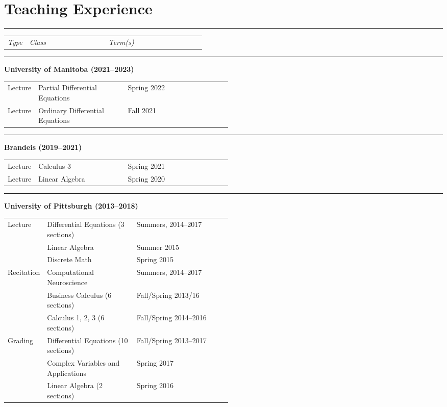 \documentclass[a4paper,11pt]{article}
\begin{document}
\newpage

\section{Teaching Experience}

\noindent\rule{15cm}{0.4pt}

\begin{tabular}{p{0.11\linewidth}p{0.4\linewidth}p{.3\linewidth}}
	\textit{Type} & \textit{Class} & \textit{Term(s)}
\end{tabular}

\noindent\rule{15cm}{0.4pt}

\textbf{University of Manitoba (2021--2023)}

\begin{tabular}{p{0.11\linewidth}p{0.4\linewidth}p{.3\linewidth}}
	{Lecture} & Partial Differential Equations & Spring 2022\\
    {Lecture} & Ordinary Differential Equations & Fall 2021
\end{tabular}


\noindent\rule{15cm}{0.4pt}

\textbf{Brandeis (2019--2021)}

\begin{tabular}{p{0.11\linewidth}p{0.4\linewidth}p{.3\linewidth}}
    {Lecture} & Calculus 3 & Spring 2021\\
    {Lecture} & Linear Algebra & Spring 2020
\end{tabular}

\noindent\rule{15cm}{0.4pt}

\textbf{University of Pittsburgh (2013--2018)}

\begin{tabular}{p{0.11\linewidth}p{0.4\linewidth}p{.3\linewidth}}
	 Lecture & Differential Equations (3 sections) & Summers, 2014--2017\\
	 & Linear Algebra & Summer 2015 \\
	 & Discrete Math & Spring 2015 \\
	 Recitation & Computational Neuroscience & Summers, 2014--2017 \\
	  & Business Calculus (6 sections) & Fall/Spring 2013/16\\
	  & Calculus 1, 2, 3 (6 sections) & Fall/Spring 2014--2016\\
	 Grading & Differential Equations (10 sections) & Fall/Spring 2013--2017  \\
	 & Complex Variables and Applications & Spring 2017 \\
	 & Linear Algebra (2 sections) & Spring 2016
\end{tabular}
\end{document}

